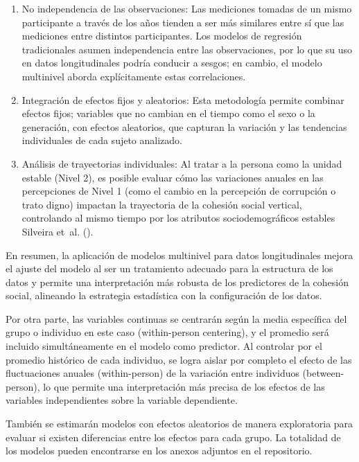 \documentclass[
  spanish,
  a4paper,
  oneside]{scrbook}
\begin{document}
\begin{enumerate}
\def\labelenumi{\arabic{enumi}.}
\item
  No independencia de las observaciones: Las mediciones tomadas de un
  mismo participante a través de los años tienden a ser más similares
  entre sí que las mediciones entre distintos participantes. Los modelos
  de regresión tradicionales asumen independencia entre las
  observaciones, por lo que su uso en datos longitudinales podría
  conducir a sesgos; en cambio, el modelo multinivel aborda
  explícitamente estas correlaciones.
\item
  Integración de efectos fijos y aleatorios: Esta metodología permite
  combinar efectos fijos; variables que no cambian en el tiempo como el
  sexo o la generación, con efectos aleatorios, que capturan la
  variación y las tendencias individuales de cada sujeto analizado.
\item
  Análisis de trayectorias individuales: Al tratar a la persona como la
  unidad estable (Nivel 2), es posible evaluar cómo las variaciones
  anuales en las percepciones de Nivel 1 (como el cambio en la
  percepción de corrupción o trato digno) impactan la trayectoria de la
  cohesión social vertical, controlando al mismo tiempo por los
  atributos sociodemográficos estables Silveira et~al.
  ().
\end{enumerate}

En resumen, la aplicación de modelos multinivel para datos
longitudinales mejora el ajuste del modelo al ser un tratamiento
adecuado para la estructura de los datos y permite una interpretación
más robusta de los predictores de la cohesión social, alineando la
estrategia estadística con la configuración de los datos.

Por otra parte, las variables continuas se centrarán según la media
específica del grupo o individuo en este caso (within-person centering),
y el promedio será incluido simultáneamente en el modelo como predictor.
Al controlar por el promedio histórico de cada individuo, se logra
aislar por completo el efecto de las fluctuaciones anuales
(within-person) de la variación entre individuos (between-person), lo
que permite una interpretación más precisa de los efectos de las
variables independientes sobre la variable dependiente.

También se estimarán modelos con efectos aleatorios de manera
exploratoria para evaluar si existen diferencias entre los efectos para
cada grupo. La totalidad de los modelos pueden encontrarse en los anexos
adjuntos en el repositorio.
\end{document}
